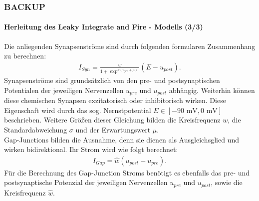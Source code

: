 \documentclass[10pt,t,aspectratio=1610]{beamer}
\newcommand{\ChapterBackup}{BACKUP}
\begin{document}

\begin{frame}
	\frametitle{\ChapterBackup}
	\framesubtitle{Herleitung des Leaky Integrate and Fire - Modells (3/3)}
	\vspace{0.3cm}
	Die anliegenden Synapsenströme sind durch folgenden formularen Zusammenhang zu berechnen:
	\begin{align}
	\label{eq:chem_syn_current}
	I_{Syn} = \frac{w}{1 + \exp^{\sigma(u_{pre} + \mu)}}(E - u_{post})\text{.}
	\end{align}
	Synapsenströme sind grundsätzlich von den pre- und postsynaptischen Potentialen der jeweiligen Nervenzellen $u_{pre}$ und $u_{post}$ abhängig. Weiterhin können diese chemischen Synapsen exzitatorisch oder inhibitorisch wirken. Diese Eigenschaft wird durch das sog. Nernstpotential $E\in[-90\text{ mV}, 0\text{ mV}]$ beschrieben. Weitere Größen dieser Gleichung bilden die Kreisfrequenz $w$, die Standardabweichung $\sigma$ und der Erwartungswert $\mu$.\\
	Gap-Junctions bilden die Ausnahme, denn sie dienen als Ausgleichsglied und wirken bidirektional. Ihr Strom wird wie folgt berechnet:
	\begin{align}
	\label{eq:gap_syn_current}
	I_{Gap} = \hat{w}(u_{post} - u_{pre})\text{.}
	\end{align}
	Für die Berechnung des Gap-Junction Stroms benötigt es ebenfalls das pre- und postsynaptische Potenzial der jeweiligen Nervenzellen $u_{pre}$ und $u_{post}$, sowie die Kreisfrequenz $\hat{w}$.
\end{frame}

\end{document}
